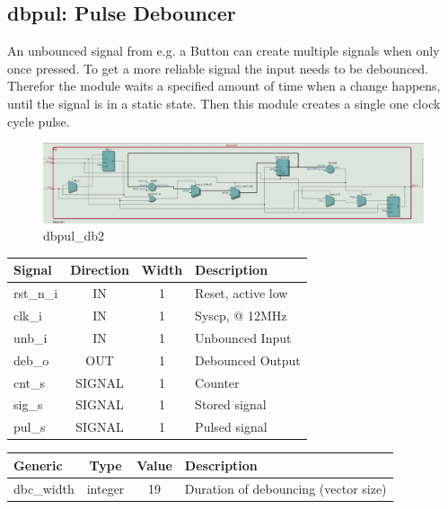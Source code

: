 \documentclass[12pt,a4 paper] {report}
\begin{document}
\newpage

\subsection{dbpul: Pulse Debouncer}
An unbounced signal from e.g. a Button can create multiple signals when only once pressed. To get a more reliable signal 
the input needs to be debounced. Therefor the module waits a specified amount of time when a change happens, until the 
signal is in a static state. Then this module creates a single one clock cycle pulse.
\begin{figure}[h]
	\centering	
	\includegraphics[scale=0.3]{../png/dbpul_db2.png}
	\caption{dbpul\_db2}
\end{figure}
\begin{center}
	\begin{tabular}{ | p{2cm} | c | c | p{5cm} |}
		\hline
		\textbf{Signal} & \textbf{Direction} & \textbf{Width} & \textbf{Description} \\
		\hline
		\hline
		rst\_n\_i & IN & 1 & Reset, active low \\
		\hline
		clk\_i & IN & 1 & Syscp, @ 12MHz \\
		\hline
		unb\_i & IN & 1 & Unbounced Input \\
		\hline
		deb\_o & OUT & 1 & Debounced Output \\
		\hline
		\hline	
		cnt\_s & SIGNAL & 1 & Counter \\
		\hline
		sig\_s & SIGNAL & 1 & Stored signal \\ 
		\hline
		pul\_s & SIGNAL & 1 & Pulsed signal \\
		\hline
	\end{tabular}
\end{center}
\begin{center}
	\begin{tabular}{| p{2cm} | c | c | p{5cm} |}
	\hline
	\textbf{Generic} & \textbf{Type} & \textbf{Value} & \textbf{Description} \\
	\hline
	dbc\_width & integer & 19 & Duration of debouncing (vector size) \\
	\hline
	\end{tabular}
\end{center}
\end{document}
